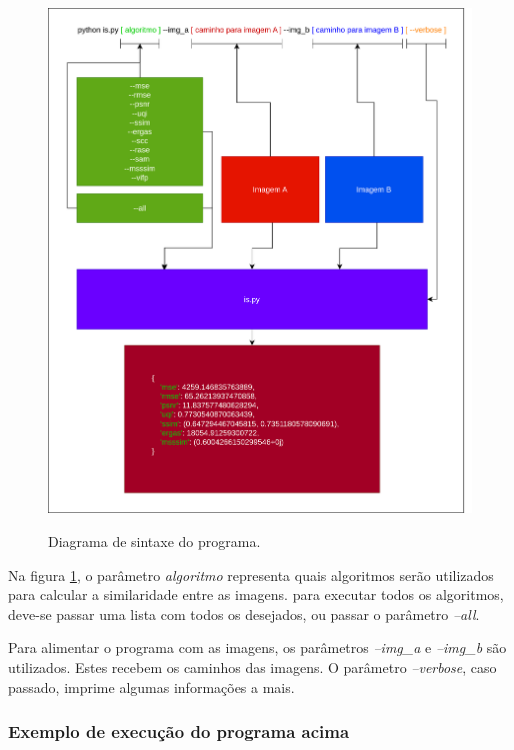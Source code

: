 \begin{figure}[H]
    \centering
    \caption{Diagrama de sintaxe do programa.}
    \includegraphics[width=14cm]{fig/similarity/image_similarity_script.png}
    \label{fig:fig31}
\end{figure}

Na figura \ref{fig:fig31}, o parâmetro \textit{algoritmo} representa quais algoritmos serão utilizados para calcular a similaridade entre as imagens. para executar todos os algoritmos, deve-se passar uma lista com todos os desejados, ou passar o parâmetro \textit{--all}.

Para alimentar o programa com as imagens, os parâmetros \textit{--img\_a} e \textit{--img\_b} são utilizados. Estes recebem os caminhos das imagens. O parâmetro \textit{--verbose}, caso passado, imprime algumas informações a mais.

\subsubsection{Exemplo de execução do programa acima}

